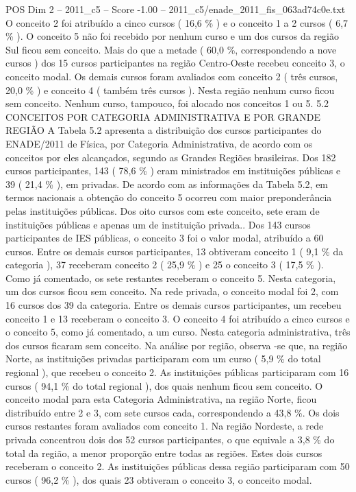 \begin{textsample}{POS Dim 2 – 2011\_c5 – Score -1.00 – 2011\_c5/enade\_2011\_fis\_063ad74c0e.txt}
O conceito 2 foi atribuído a cinco cursos ( 16,6 \% ) e o conceito 1 a 2 cursos ( 6,7 \% ).
O conceito 5 não foi recebido por nenhum curso e um dos cursos da região Sul ficou sem conceito.
Mais do que a metade ( 60,0 \%, correspondendo a nove cursos ) dos 15 cursos participantes na região Centro-Oeste recebeu conceito 3, o conceito modal.
Os demais cursos foram avaliados com conceito 2 ( três cursos, 20,0 \% ) e conceito 4 ( também três cursos ).
Nesta região nenhum curso ficou sem conceito.
Nenhum curso, tampouco, foi alocado nos conceitos 1 ou 5. 5.2 CONCEITOS POR CATEGORIA ADMINISTRATIVA E POR GRANDE REGIÃO A Tabela 5.2 apresenta a distribuição dos cursos participantes do ENADE/2011 de Física, por Categoria Administrativa, de acordo com os conceitos por eles alcançados, segundo as Grandes Regiões brasileiras.
Dos 182 cursos participantes, 143 ( 78,6 \% ) eram ministrados em instituições públicas e 39 ( 21,4 \% ), em privadas.
De acordo com as informações da Tabela 5.2, em termos nacionais a obtenção do conceito 5 ocorreu com maior preponderância pelas instituições públicas.
Dos oito cursos com este conceito, sete eram de instituições públicas e apenas um de instituição privada..
Dos 143 cursos participantes de IES públicas, o conceito 3 foi o valor modal, atribuído a 60 cursos.
Entre os demais cursos participantes, 13 obtiveram conceito 1 ( 9,1 \% da categoria ), 37 receberam conceito 2 ( 25,9 \% ) e 25 o conceito 3 ( 17,5 \% ).
Como já comentado, os sete restantes receberam o conceito 5.
Nesta categoria, um dos cursos ficou sem conceito.
Na rede privada, o conceito modal foi 2, com 16 cursos dos 39 da categoria.
Entre os demais cursos participantes, um recebeu conceito 1 e 13 receberam o conceito 3.
O conceito 4 foi atribuído a cinco cursos e o conceito 5, como já comentado, a um curso.
Nesta categoria administrativa, três dos cursos ficaram sem conceito.
Na análise por região, observa -se que, na região Norte, as instituições privadas participaram com um curso ( 5,9 \% do total regional ), que recebeu o conceito 2.
As instituições públicas participaram com 16 cursos ( 94,1 \% do total regional ), dos quais nenhum ficou sem conceito.
O conceito modal para esta Categoria Administrativa, na região Norte, ficou distribuído entre 2 e 3, com sete cursos cada, correspondendo a 43,8 \%.
Os dois cursos restantes foram avaliados com conceito 1.
Na região Nordeste, a rede privada concentrou dois dos 52 cursos participantes, o que equivale a 3,8 \% do total da região, a menor proporção entre todas as regiões.
Estes dois cursos receberam o conceito 2.
As instituições públicas dessa região participaram com 50 cursos ( 96,2 \% ), dos quais 23 obtiveram o conceito 3, o conceito modal.

\end{textsample}
